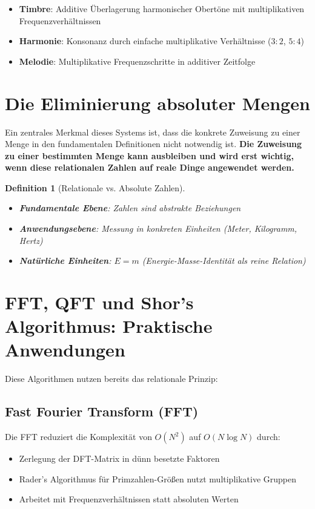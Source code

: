 \documentclass[11pt,a4paper]{article}
\newtheorem{definition}{Definition}[section]
\begin{document}
	\begin{itemize}
		\item \textbf{Timbre}: Additive Überlagerung harmonischer Obertöne mit multiplikativen Frequenzverhältnissen
		\item \textbf{Harmonie}: Konsonanz durch einfache multiplikative Verhältnisse ($3:2$, $5:4$)
		\item \textbf{Melodie}: Multiplikative Frequenzschritte in additiver Zeitfolge
	\end{itemize}
	
	\section{Die Eliminierung absoluter Mengen}
	
	Ein zentrales Merkmal dieses Systems ist, dass die konkrete Zuweisung zu einer Menge in den fundamentalen Definitionen nicht notwendig ist. \textbf{Die Zuweisung zu einer bestimmten Menge kann ausbleiben und wird erst wichtig, wenn diese relationalen Zahlen auf reale Dinge angewendet werden.}
	
	\begin{definition}[Relationale vs. Absolute Zahlen]
		\begin{itemize}
			\item \textbf{Fundamentale Ebene}: Zahlen sind abstrakte Beziehungen
			\item \textbf{Anwendungsebene}: Messung in konkreten Einheiten (Meter, Kilogramm, Hertz)
			\item \textbf{Natürliche Einheiten}: $E = m$ (Energie-Masse-Identität als reine Relation)
		\end{itemize}
	\end{definition}
	
	\section{FFT, QFT und Shor's Algorithmus: Praktische Anwendungen}
	
	Diese Algorithmen nutzen bereits das relationale Prinzip:
	
	\subsection{Fast Fourier Transform (FFT)}
	
	Die FFT reduziert die Komplexität von $O(N^2)$ auf $O(N \log N)$ durch:
	\begin{itemize}
		\item Zerlegung der DFT-Matrix in dünn besetzte Faktoren
		\item Rader's Algorithmus für Primzahlen-Größen nutzt multiplikative Gruppen
		\item Arbeitet mit Frequenzverhältnissen statt absoluten Werten
	\end{itemize}
	
\end{document}
